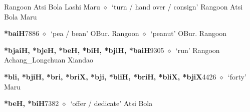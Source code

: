 \begin{list}{}{\leftmargin=1.5em \itemindent=-1.5em}
         Rangoon 
\hspace{1ex}
         Atsi 
\hspace{1ex}
         Bola 
\hspace{1ex}
         Lashi 
\hspace{1ex}
         Maru 
\hspace{1ex}
         $\diamond$~`turn / hand over / consign'
         Rangoon 
\hspace{1ex}
         Atsi 
\hspace{1ex}
         Bola 
\hspace{1ex}
         Maru 
  \item {\footnotesize \textbf{*baiH}}{\tiny 7886}
\hspace{1ex}
         $\diamond$~`pea / bean'
         OBur. 
\hspace{1ex}
         Rangoon 
\hspace{1ex}
         $\diamond$~`peanut'
         OBur. 
\hspace{1ex}
         Rangoon 
  \item {\footnotesize \textbf{*bjaiH, *bjeH, *beH, *biH, *bjiH, *baiH}}{\tiny 9305}
\hspace{1ex}
         $\diamond$~`run'
         Rangoon 
\hspace{1ex}
         Achang\_Longchuan 
\hspace{1ex}
         Xiandao 
  \item {\footnotesize \textbf{*bli, *bjiH, *bri, *briX, *bji, *bliH, *briH, *bliX, *bjiX}}{\tiny 4426}
\hspace{1ex}
         $\diamond$~`forty'
         Maru 
  \item {\footnotesize \textbf{*beH, *biH}}{\tiny 7382}
\hspace{1ex}
         $\diamond$~`offer / dedicate'
         Atsi 
\hspace{1ex}
         Bola 
\hspace{1ex}

\end{list}
